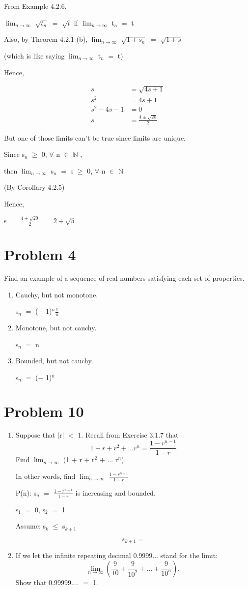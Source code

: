 \documentclass{article}
\newcommand{\mt}[1]{\ensuremath{#1}}
\newcommand\bsc[2][\DefaultOpt]{%
  \def\DefaultOpt{#2}%
  \section[#1]{#2}%
}
\newcommand{\balist}{\begin{enumerate}[label=\alph*.]}
\newcommand{\elist}{\end{enumerate}}
\newcommand{\bn}{\mt{\mathbb{N}} }       %
\newcommand{\fa}{\mt{\forall} }          %
\newcommand{\mem}{\mt{\in} }
\newcommand{\av}[1]{\mt{|}#1\mt{|}}  %
\newcommand{\prn}[1]{(#1)}
\newcommand{\ps}{\mt{+} }
\newcommand{\ms}{\mt{-} }
\newcommand{\ls}{\mt{<} }
\newcommand{\lse}{\mt{\leq} }
\newcommand{\gre}{\mt{\geq} }
\newcommand{\eql}{\mt{=} }
\newcommand{\uw}[2]{#1\mt{_{#2}}}
\newcommand{\uf}[2]{#1\mt{^{#2}}}
\newcommand{\frc}[2]{\mt{\frac{#1}{#2}}}
\newcommand{\lmti}[1]{\mt{\displaystyle{\lim_{#1 \to \infty}}}}
\newcommand{\eqn}[1]{\[#1\]}
\newcommand{\splt}[1]{\begin{split}#1\end{split}}
\begin{document}
{From Example 4.2.6,

\lmti{n} $\sqrt{\uw{t}{n}}$ \eql $\sqrt{t}$ if \lmti{n} \uw{t}{n} \eql t

Also, by Theorem 4.2.1 (b), \lmti{n} $\sqrt{1 + s_n}$ \eql $\sqrt{1 + s}$

(which is like saying \lmti{n} \uw{t}{n} \eql t)

Hence,

\eqn{
	\splt{
		s & = \sqrt{4s + 1} \\
		s^2 & = 4s + 1 \\
		s^2 - 4s - 1 & = 0 \\
		s & = \frac{4 \pm \sqrt{20}}{2}
	}
}

But one of those limits can't be true since limits are unique.

Since \uw{s}{n} \gre 0, \fa n \mem \bn,

then \lmti{n} \uw{s}{n} \eql s \gre 0, \fa n \mem \bn 

(By Corollary 4.2.5)

Hence, 

s \eql $\frac{4 + \sqrt{20}}{2}$ \eql $2 + \sqrt{5}$

\bsc{Problem 4}{
Find an example of a sequence of real numbers satisfying each set of properties.
\balist
\item Cauchy, but not monotone.
	
	\uw{s}{n} \eql \prn{\ms1}$^{n}$\frc{1}{n}
\item Monotone, but not cauchy.

	\uw{s}{n} \eql n
\item Bounded, but not cauchy.
	
	\uw{s}{n} \eql \prn{\ms1}$^{n}$
\elist
}

\bsc{Problem 10}{
\balist
\item Suppose that \av{r} \ls 1. Recall from Exercise 3.1.7 that
\eqn{1 + r + r^2 + ... r^n = \frac{1 - r^{n - 1}}{1 - r}}
	Find \lmti{n} (1 \ps r \ps r$^2$ \ps ... \uf{r}{n}).
	
	In other words, find \lmti{n} \frc{1 - r^{n - 1}}{1 - r}
	
	P(n): \uw{s}{n} \eql \frc{1 - r^{n - 1}}{1 - r} is increasing and bounded.
	
	\uw{s}{1} \eql 0, \uw{s}{2} \eql 1
	
	Assume: \uw{s}{k} \lse \uw{s}{k + 1}
	
	\eqn{\uw{s}{k + 1} = }
\item If we let the infinite repeating decimal 0.9999... stand for the limit:
\eqn{\lmti{n}(\frac{9}{10} + \frac{9}{10^2} + ... + \frac{9}{10^n}),}
	Show that 0.99999.... \eql 1.
\elist
}

}
\end{document}
